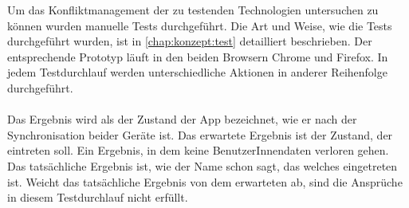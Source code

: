 Um das Konfliktmanagement der zu testenden Technologien untersuchen zu können wurden manuelle Tests durchgeführt.
Die Art und Weise, wie die Tests durchgeführt wurden, ist in \autoref{chap:konzept:test} detailliert beschrieben.
Der entsprechende Prototyp läuft in den beiden Browsern Chrome und Firefox. In jedem Testdurchlauf werden unterschiedliche Aktionen in anderer Reihenfolge durchgeführt.\\\\
%
%
Das Ergebnis wird als der Zustand der \gls{App} bezeichnet, wie er nach der Synchronisation beider Geräte ist.
Das erwartete Ergebnis ist der Zustand, der eintreten soll. Ein Ergebnis, in dem keine BenutzerInnendaten verloren gehen.\\
Das tatsächliche Ergebnis ist, wie der Name schon sagt, das welches eingetreten ist.
Weicht das tatsächliche Ergebnis von dem erwarteten ab, sind die Ansprüche in diesem Testdurchlauf nicht erfüllt. 
% 
% 

%
%

%
%
%

%
%
%
%
